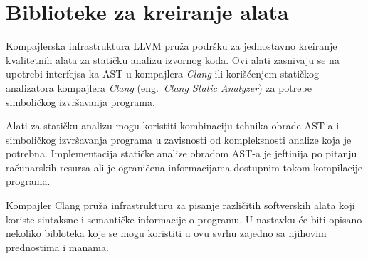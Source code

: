 \documentclass[12pt,oneside]{memoir}
\begin{document}
\section{Biblioteke za kreiranje alata}

Kompajlerska infrastruktura LLVM pru\v{z}a podr\v{s}ku za jednostavno kreiranje kvalitetnih alata za stati\v{c}ku analizu izvornog koda. Ovi alati
zasnivaju se na upotrebi interfejsa ka AST-u kompajlera \textit{Clang} ili kori\v{s}\'{c}enjem stati\v{c}kog analizatora kompajlera \textit{Clang} (eng.~\textit{Clang Static Analyzer}) za potrebe simboli\v{c}kog izvr\v{s}avanja programa. \par Alati za stati\v{c}ku analizu mogu koristiti kombinaciju tehnika obrade AST-a i simboli\v{c}kog izvr\v{s}avanja programa u zavisnosti od kompleksnosti analize koja je potrebna. Implementacija stati\v{c}ke analize obradom AST-a je jeftinija po pitanju ra\v{c}unarskih resursa ali je ograni\v{c}ena informacijama dostupnim tokom kompilacije programa. \par 

 Kompajler Clang pru\v{z}a infrastrukturu za pisanje razli\v{c}itih softverskih alata koji koriste sintaksne i semanti\v{c}ke informacije o programu. U nastavku \'{c}e biti opisano nekoliko bibloteka koje se mogu koristiti u ovu svrhu zajedno sa njihovim prednostima i manama.
\end{document}
